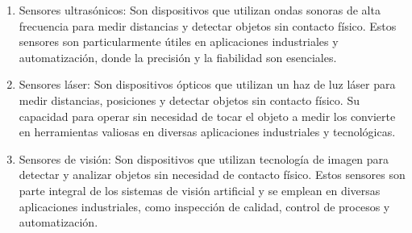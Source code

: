 \begin{enumerate}
\begin{enumerate}
\begin{figure}[h]
{					\label{fig:Sensores de microondas}
					\cite{microo}
				}
				\hfill
			\end{figure}
			\item Sensores ultrasónicos: Son dispositivos que utilizan ondas sonoras de alta frecuencia para medir distancias y detectar objetos sin contacto físico. Estos sensores son particularmente útiles en aplicaciones industriales y automatización, donde la precisión y la fiabilidad son esenciales.\cite{ultrason}\\ 
			\begin{figure}[h]
				\centering
				\hfill
			\end{figure}
			\item Sensores láser: Son dispositivos ópticos que utilizan un haz de luz láser para medir distancias, posiciones y detectar objetos sin contacto físico. Su capacidad para operar sin necesidad de tocar el objeto a medir los convierte en herramientas valiosas en diversas aplicaciones industriales y tecnológicas.\cite{Slaser}\\ 
			\begin{figure}[h]
				\centering
				\hfill
			\end{figure}
			\item Sensores de visión: Son dispositivos que utilizan tecnología de imagen para detectar y analizar objetos sin necesidad de contacto físico. Estos sensores son parte integral de los sistemas de visión artificial y se emplean en diversas aplicaciones industriales, como inspección de calidad, control de procesos y automatización.\cite{Svision}\\ 
			\begin{figure}[h]
				\centering
				\hfill
			\end{figure}
		\end{enumerate}
	\end{enumerate}
	
